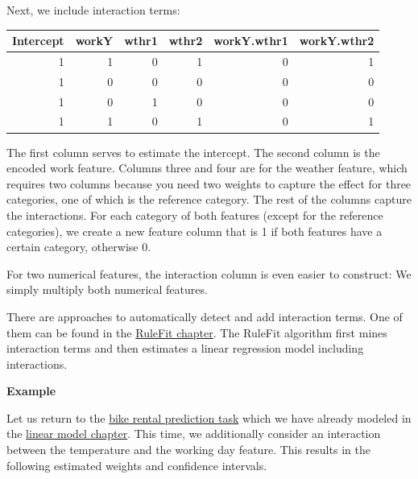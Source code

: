 \documentclass[
  10pt,
]{scrbook}
\begin{document}
Next, we include interaction terms:

\begin{table}
\centering
\begin{tabular}{rrrrrr}
\toprule
Intercept & workY & wthr1 & wthr2 & workY.wthr1 & workY.wthr2\\
\midrule
1 & 1 & 0 & 1 & 0 & 1\\
1 & 0 & 0 & 0 & 0 & 0\\
1 & 0 & 1 & 0 & 0 & 0\\
1 & 1 & 0 & 1 & 0 & 1\\
\bottomrule
\end{tabular}
\end{table}

The first column serves to estimate the intercept.
The second column is the encoded work feature.
Columns three and four are for the weather feature, which requires two columns because you need two weights to capture the effect for three categories, one of which is the reference category.
The rest of the columns capture the interactions.
For each category of both features (except for the reference categories), we create a new feature column that is 1 if both features have a certain category, otherwise 0.

For two numerical features, the interaction column is even easier to construct:
We simply multiply both numerical features.

There are approaches to automatically detect and add interaction terms.
One of them can be found in the \protect\hyperlink{rulefit}{RuleFit chapter}.
The RuleFit algorithm first mines interaction terms and then estimates a linear regression model including interactions.

\textbf{Example}

Let us return to the \protect\hyperlink{bike-data}{bike rental prediction task} which we have already modeled in the \protect\hyperlink{limo}{linear model chapter}.
This time, we additionally consider an interaction between the temperature and the working day feature.
This results in the following estimated weights and confidence intervals.
\end{document}
